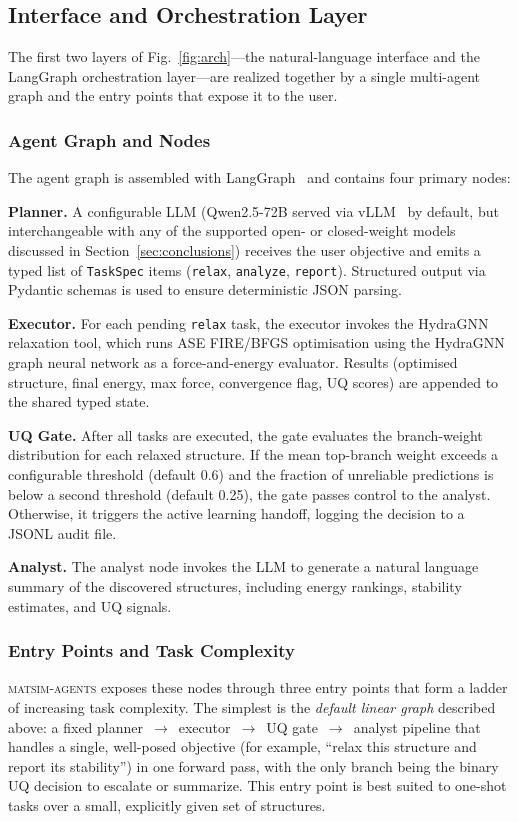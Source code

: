 \documentclass[conference]{IEEEtran}
\def\ac#1{#1}%
\def\acs#1{#1}%
\begin{document}
\subsection{Interface and Orchestration Layer}
The first two layers of Fig.~\ref{fig:arch}---the natural-language interface
and the LangGraph orchestration layer---are realized together by a single
multi-agent graph and the entry points that expose it to the user.

\subsubsection{Agent Graph and Nodes}
The agent graph is assembled with LangGraph~\cite{langgraph} and contains four
primary nodes:

\textbf{Planner.} A configurable \ac{LLM} (Qwen2.5-72B served via
vLLM~\cite{vllm} by default, but interchangeable with any of the supported
open- or closed-weight models discussed in Section~\ref{sec:conclusions})
receives the user objective and emits a typed list of
\texttt{TaskSpec} items (\texttt{relax}, \texttt{analyze}, \texttt{report}).
Structured output via Pydantic schemas is used to ensure deterministic \acs{JSON}
parsing.

\textbf{Executor.} For each pending \texttt{relax} task, the executor invokes
the HydraGNN relaxation tool, which runs \ac{ASE} \acs{FIRE}/\acs{BFGS} optimisation using the
HydraGNN graph neural network as a force-and-energy evaluator. Results
(optimised structure, final energy, max force, convergence flag, \acs{UQ} scores) are
appended to the shared typed state.

\textbf{\acs{UQ} Gate.} After all tasks are executed, the gate evaluates the
branch-weight distribution for each relaxed structure. If the mean top-branch
weight exceeds a configurable threshold (default 0.6) and the fraction of
unreliable predictions is below a second threshold (default 0.25), the gate
passes control to the analyst. Otherwise, it triggers the active learning
handoff, logging the decision to a \ac{JSONL} audit file.

\textbf{Analyst.} The analyst node invokes the \acs{LLM} to generate a natural
language summary of the discovered structures, including energy rankings,
stability estimates, and \acs{UQ} signals.

\subsubsection{Entry Points and Task Complexity}
\textsc{matsim-agents} exposes these nodes through three entry points that form
a ladder of increasing task complexity. The simplest is the \emph{default
linear graph} described above: a fixed planner~$\rightarrow$~executor~$\rightarrow$~\acs{UQ}
gate~$\rightarrow$~analyst pipeline that handles a single, well-posed objective
(for example, ``relax this structure and report its stability'') in one
forward pass, with the only branch being the binary \acs{UQ} decision to escalate
or summarize. This entry point is best suited to one-shot tasks over a small,
explicitly given set of structures.
\end{document}
